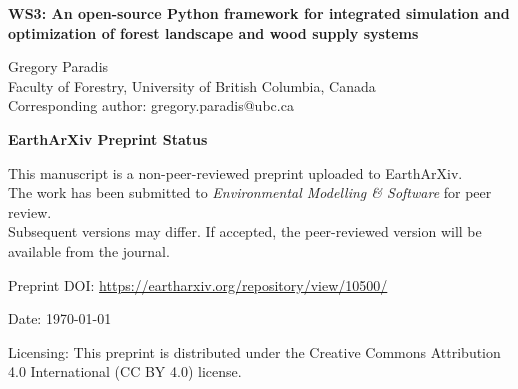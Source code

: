 \documentclass[review]{elsarticle}
\begin{document}
\begin{titlepage}
  \thispagestyle{empty}
  \vspace*{2.5cm}
  \begin{center}
    {\LARGE\bfseries WS3: An open-source Python framework for integrated simulation and optimization of forest landscape and wood supply systems\par}
    \vspace{1.5cm}
    {\large Gregory Paradis\\Faculty of Forestry, University of British Columbia, Canada\\Corresponding author: gregory.paradis@ubc.ca\par}
    \vspace{1.5cm}
    {\large\bfseries EarthArXiv Preprint Status\par}
    \vspace{0.6cm}
    {\normalsize This manuscript is a non\hyp peer\hyp reviewed preprint uploaded to EarthArXiv.\\
    The work has been submitted to \textit{Environmental Modelling \& Software} for peer review.\\
    Subsequent versions may differ. If accepted, the peer\hyp reviewed version will be available from the journal.\par}
    \vspace{1.0cm}
    {\normalsize Preprint DOI: \url{https://eartharxiv.org/repository/view/10500/}\par}
    \vspace{0.8cm}
    {\normalsize Date: \today\par}
    \vspace{0.8cm}
    {\normalsize Licensing: This preprint is distributed under the Creative Commons Attribution 4.0 International (CC BY 4.0) license.\par}
  \end{center}
  \vfill
\end{titlepage}
\setcounter{page}{2}
\end{document}
